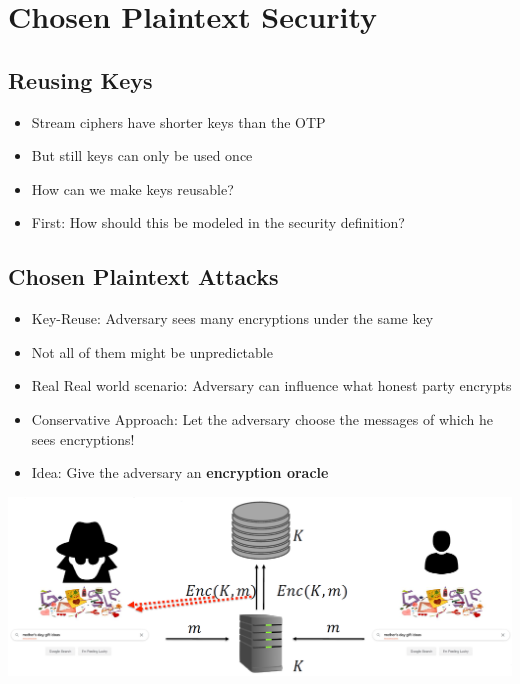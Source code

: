 

\chapter{Chosen Plaintext Security}



\section{Reusing Keys}
	\begin{itemize}
	    \item Stream ciphers have shorter keys than the OTP
	    \item But still keys can only be used once
	    \item How can we make keys reusable?
	    \item First: How should this be modeled in the security definition?
	\end{itemize}
	
	
\section{Chosen Plaintext Attacks}
	\begin{itemize}
	    \item Key-Reuse: Adversary sees many encryptions under the same key
	    \item Not all of them might be unpredictable
	    \item Real Real world scenario: Adversary can influence what honest party encrypts
	    \item Conservative Approach: Let the adversary choose the messages of which he sees encryptions!
	    \item Idea: Give the adversary an \textbf{encryption oracle}
	\end{itemize}
	\begin{center}
		\includegraphics[width=160mm]{Graphics/CPA/cpa1.png}
	\end{center}
	
